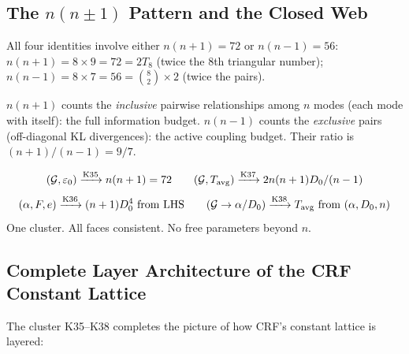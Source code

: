 \documentclass[12pt, a4paper]{article}
\begin{document}
\subsection{The $n(n\pm 1)$ Pattern and the Closed Web}

All four identities involve either $n(n+1)=72$ or $n(n-1)=56$:
$n(n+1) = 8\times 9 = 72 = 2T_8$ (twice the 8th triangular number);
$n(n-1) = 8\times 7 = 56 = \binom{8}{2}\times 2$ (twice the pairs).

$n(n+1)$ counts the \emph{inclusive} pairwise relationships among $n$ modes
(each mode with itself): the full information budget.
$n(n-1)$ counts the \emph{exclusive} pairs (off-diagonal KL divergences):
the active coupling budget. Their ratio is $(n+1)/(n-1) = 9/7$.

\begin{keybox}[title={The Closed Web: Given Any Two of $(\mathcal{G},\varepsilon_0,F,T_{\rm avg},D_0,\alpha)$ Plus $n$, All Others are Determined}]
\[
  (\mathcal{G},\varepsilon_0) \xrightarrow{\rm K35} n(n+1)=72
  \qquad (\mathcal{G},T_{\rm avg}) \xrightarrow{\rm K37} 2n(n+1)D_0/(n-1)
\]
\[
  (\alpha,F,e) \xrightarrow{\rm K36} (n+1)D_0^4\text{ from LHS}
  \qquad (\mathcal{G}\to\alpha/D_0) \xrightarrow{\rm K38} T_{\rm avg}\text{ from }(\alpha,D_0,n)
\]
One cluster. All faces consistent. No free parameters beyond $n$.
\end{keybox}

\subsection{Complete Layer Architecture of the CRF Constant Lattice}

The cluster K35--K38 completes the picture of how CRF's constant lattice is layered:
\end{document}
